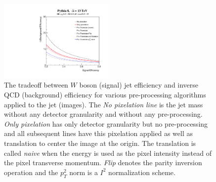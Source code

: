 \begin{figure}[htbp!]
  \begin{center}
        \includegraphics[width=0.5\textwidth]{figures/ROCs_compare.pdf}
      \caption{ The tradeoff between $W$ boson (signal) jet efficiency and inverse QCD (background) efficiency for various pre-processing algorithms applied to the jet (images).  The {\it No pixelation line} is the jet mass without any detector granularity and without any pre-processing.  {\it Only pixelation} has only detector granularity but no pre-processing and all subsequent lines have this pixelation applied as well as translation to center the image at the origin.  The translation is called {\it naive} when the energy is used as the pixel intensity instead of the pixel transverse momentum.  {\it Flip} denotes the parity inversion operation and the $p_T^2$ norm is a $I^2$ normalization scheme.  
      \label{fig:preprocess3} }
    \end{center}
\end{figure}


